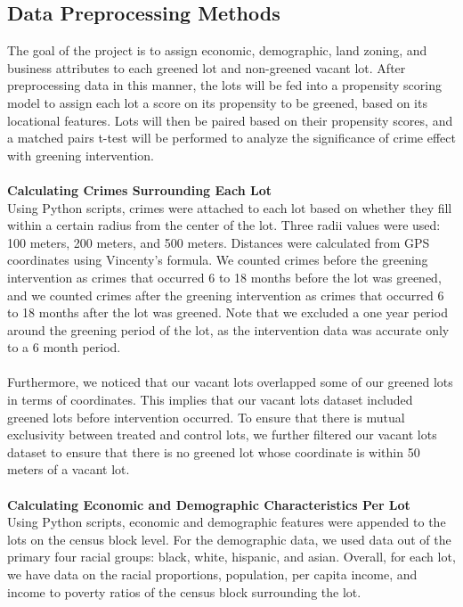 \documentclass{article}
\begin{document}
\subsection{Data Preprocessing Methods}
The goal of the project is to assign economic, demographic, land zoning, and business attributes to each greened lot and non-greened vacant lot. After preprocessing data in this manner, the lots will be fed into a propensity scoring model to assign each lot a score on its propensity to be greened, based on its locational features. Lots will then be paired based on their propensity scores, and a matched pairs t-test will be performed to analyze the significance of crime effect with greening intervention.\\\\
\textbf{Calculating Crimes Surrounding Each Lot}\\
Using Python scripts, crimes were attached to each lot based on whether they fill within a certain radius from the center of the lot. Three radii values were used: 100 meters, 200 meters, and 500 meters. Distances were calculated from GPS coordinates using Vincenty's formula. We counted crimes before the greening intervention as crimes that occurred 6 to 18 months before the lot was greened, and we counted crimes after the greening intervention as crimes that occurred 6 to 18 months after the lot was greened. Note that we excluded a one year period around the greening period of the lot, as the intervention data was accurate only to a 6 month period. \\\\
Furthermore, we noticed that our vacant lots overlapped some of our greened lots in terms of coordinates. This implies that our vacant lots dataset included greened lots before intervention occurred. To ensure that there is mutual exclusivity between treated and control lots, we further filtered our vacant lots dataset to ensure that there is no greened lot whose coordinate is within 50 meters of a vacant lot. \\\\
\textbf{Calculating Economic and Demographic Characteristics Per Lot}\\
Using Python scripts, economic and demographic features were appended to the lots on the census block level. For the demographic data, we used data out of the primary four racial groups: black, white, hispanic, and asian. Overall, for each lot, we have data on the racial proportions, population, per capita income, and income to poverty ratios of the census block surrounding the lot.\\\\
\end{document}
